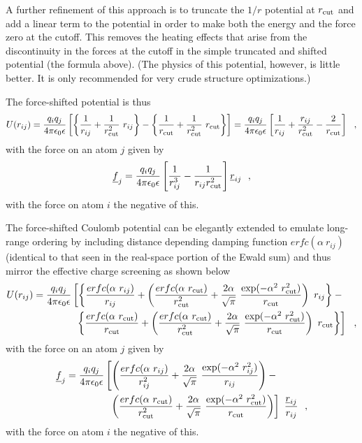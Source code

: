A further refinement of this approach is to truncate the $1/r$
potential at $r_{\rm cut}$ and add a linear term to the potential
in order to make both the energy and the force zero at the cutoff.
This removes the heating effects that arise from the discontinuity
in the forces at the cutoff in the simple truncated and shifted
potential (the formula above).  (The physics of this potential,
however, is little better.  It is only recommended for very crude
structure optimizations.)

The force-shifted potential is thus
\begin{equation}
U(r_{ij}) = {q_{i} q_{j} \over 4\pi\epsilon_{0}\epsilon}
\left[ \left\{\frac{1}{r_{ij}}+\frac{1}{r_{\rm cut}^{2}}~r_{ij}\right\} -
\left\{\frac{1}{r_{\rm cut}}+\frac{1}{r_{\rm cut}^{2}}~r_{\rm cut}\right\} \right]
= {q_{i} q_{j} \over 4\pi\epsilon_{0}\epsilon}
\left[ \frac{1}{r_{ij}} + \frac{r_{ij}}{r_{\rm cut}^{2}} - \frac{2}{r_{\rm cut}} \right]~~,
\end{equation}
with the force on an atom $j$ given by
\begin{equation}
\mbox{$\underline{f}$}_{j} = \frac{q_{i}q_{j}}{4\pi\epsilon_{0}\epsilon}
\left[ \frac{1} {r_{ij}^{3}} - \frac{1}{r_{ij}r_{\rm cut}^{2}} \right] \mbox{$\underline{r}$}_{ij}~~,
\end{equation}
with the force on atom $i$ the negative of this.

The force-shifted Coulomb potential can be elegantly extended to
emulate long-range ordering by including distance depending damping
function $erfc(\alpha~r_{ij})$ (identical to that seen in the
real-space portion of the Ewald sum) and thus mirror the effective
charge screening \cite{fennell-06a} as shown below
\begin{eqnarray}
U(r_{ij}) = {q_{i} q_{j} \over 4\pi\epsilon_{0}\epsilon} \left[
\left\{ \frac{erfc(\alpha~r_{ij})}{r_{ij}} + \left(\frac{erfc(\alpha~r_{\rm cut})}{r_{\rm cut}^{2}}+
\frac{2\alpha}{\sqrt{\pi}}~\frac{\exp(-\alpha^{2}~r_{\rm cut}^{2})}{r_{\rm cut}}\right)~r_{ij}\right\} - \phantom{xx} \right. \nonumber \\
\left. \left\{ \frac{erfc(\alpha~r_{\rm cut})}{r_{\rm cut}} + \left(\frac{erfc(\alpha~r_{\rm cut})}{r_{\rm cut}^{2}}+
\frac{2\alpha}{\sqrt{\pi}}~\frac{\exp(-\alpha^{2}~r_{\rm cut}^{2})}{r_{\rm cut}}\right)~r_{\rm cut}\right\} \right]~~,
\end{eqnarray}
with the force on an atom $j$ given by
\begin{eqnarray}
\mbox{$\underline{f}$}_{j} = {q_{i} q_{j} \over 4\pi\epsilon_{0}\epsilon} \left[ \left( \frac{erfc(\alpha~r_{ij})}{r_{ij}^{2}} +
\frac{2\alpha}{\sqrt{\pi}}~\frac{\exp(-\alpha^{2}~r_{ij}^{2})}{r_{ij}} \right) - \phantom{xxxxx} \right. \nonumber \\
\left. \left( \frac{erfc(\alpha~r_{\rm cut})}{r_{\rm cut}^{2}} +
\frac{2\alpha}{\sqrt{\pi}}~\frac{\exp(-\alpha^{2}~r_{\rm cut}^{2})}{r_{\rm cut}} \right) \right]~\frac{\mbox{$\underline{r}$}_{ij}}{r_{ij}}~~,
\end{eqnarray}
with the force on atom $i$ the negative of this.

